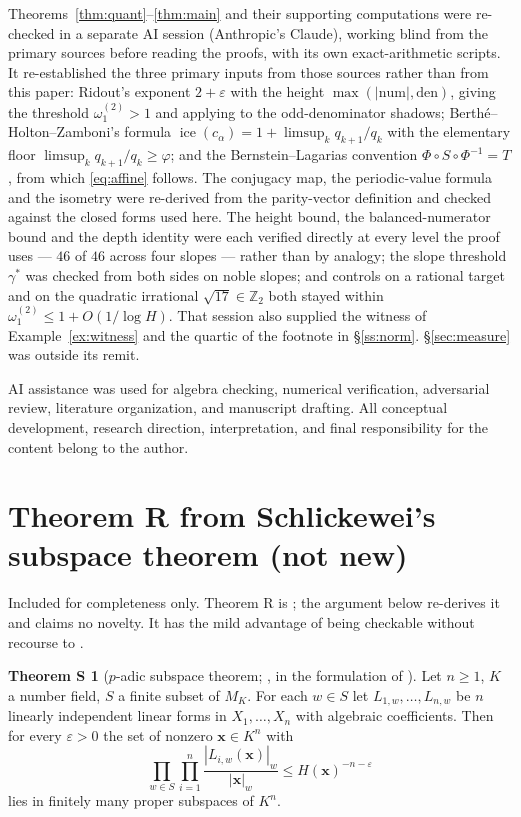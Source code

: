 \documentclass[11pt,reqno]{amsart}
\theoremstyle{plain}
\theoremstyle{definition}
\newtheorem*{theoremS}{Theorem S}
\DeclareMathOperator{\ice}{ice}
\newcommand{\Z}{\mathbb{Z}}
\newcommand{\Zt}{\Z_2}
\newcommand{\PH}{\Phi}
\newcommand{\gs}{\gamma^{*}}
\newcommand{\om}{\omega_1^{(2)}}
\begin{document}
Theorems~\ref{thm:quant}--\ref{thm:main} and their supporting computations were re-checked in a
separate AI session (Anthropic's Claude), working blind from the primary sources before reading the
proofs, with its own exact-arithmetic scripts. It re-established the three primary inputs from those
sources rather than from this paper: Ridout's exponent $2+\varepsilon$ with the height
$\max(|\mathrm{num}|,\mathrm{den})$, giving the threshold $\om>1$ and applying to the
odd-denominator shadows; Berth\'e--Holton--Zamboni's formula
$\ice(c_\alpha)=1+\limsup_k q_{k+1}/q_k$ with the elementary floor
$\limsup_k q_{k+1}/q_k\ge\varphi$; and the Bernstein--Lagarias convention
$\PH\circ S\circ\PH^{-1}=T$, from which \eqref{eq:affine} follows. The conjugacy map, the
periodic-value formula and the isometry were re-derived from the parity-vector definition and
checked against the closed forms used here. The height bound, the balanced-numerator bound and the
depth identity were each verified directly at every level the proof uses --- $46$ of $46$ across
four slopes --- rather than by analogy; the slope threshold $\gs$ was checked from both sides on
noble slopes; and controls on a rational target and on the quadratic irrational $\sqrt{17}\in\Zt$
both stayed within $\om\le1+O(1/\log H)$. That session also supplied the witness of
Example~\ref{ex:witness} and the quartic of the footnote in \S\ref{ss:norm}.
\S\ref{sec:measure} was outside its remit.

AI assistance was used for algebra checking, numerical verification, adversarial review, literature
organization, and manuscript drafting. All conceptual development, research direction,
interpretation, and final responsibility for the content belong to the author.

\appendix

\section{Theorem R from Schlickewei's subspace theorem (not new)}\label{app:schlickewei}

Included for completeness only. Theorem R is \cite[Theorem 1.3]{BK18}; the argument below
re-derives it and claims no novelty. It has the mild advantage of being checkable without recourse
to \cite{Ridout58}.

\begin{theoremS}[{$p$-adic subspace theorem; \cite{Schlickewei76,Schlickewei77}, in the formulation
of \cite[Theorem 7.2.2]{BG06}}]
Let $n\ge1$, $K$ a number field, $S$ a finite subset of $M_K$. For each $w\in S$ let
$L_{1,w},\dots,L_{n,w}$ be $n$ linearly independent linear forms in $X_1,\dots,X_n$ with algebraic
coefficients. Then for every $\varepsilon>0$ the set of nonzero $\mathbf{x}\in K^{n}$ with
\[
  \prod_{w\in S}\prod_{i=1}^{n}\frac{|L_{i,w}(\mathbf{x})|_w}{|\mathbf{x}|_w}
  \le H(\mathbf{x})^{-n-\varepsilon}
\]
lies in finitely many proper subspaces of $K^{n}$.
\end{theoremS}
\end{document}
